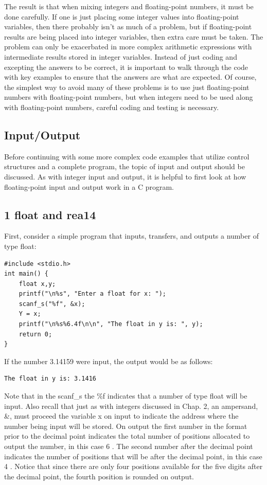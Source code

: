 \documentclass[10pt]{article}
\begin{document}
The result is that when mixing integers and floating-point numbers, it must be done carefully. If one is just placing some integer values into floating-point variables, then there probably isn't as much of a problem, but if floating-point results are being placed into integer variables, then extra care must be taken. The problem can only be exacerbated in more complex arithmetic expressions with intermediate results stored in integer variables. Instead of just coding and excepting the answers to be correct, it is important to walk through the code with key examples to ensure that the answers are what are expected. Of course, the simplest way to avoid many of these problems is to use just floating-point numbers with floating-point numbers, but when integers need to be used along with floating-point numbers, careful coding and testing is necessary.

\subsection*{Input/Output}
Before continuing with some more complex code examples that utilize control structures and a complete program, the topic of input and output should be discussed. As with integer input and output, it is helpful to first look at how floating-point input and output work in a C program.

\subsection*{1 float and rea14}
First, consider a simple program that inputs, transfers, and outputs a number of type float:

\begin{verbatim}
#include <stdio.h>
int main() {
    float x,y;
    printf("\n%s", "Enter a float for x: ");
    scanf_s("%f", &x);
    Y = x;
    printf("\n%s%6.4f\n\n", "The float in y is: ", y);
    return 0;
}
\end{verbatim}

If the number 3.14159 were input, the output would be as follows:

\begin{verbatim}
The float in y is: 3.1416
\end{verbatim}

Note that in the scanf\_s the \%f indicates that a number of type float will be input. Also recall that just as with integers discussed in Chap. 2, an ampersand, \&, must proceed the variable x on input to indicate the address where the number being input will be stored. On output the first number in the format prior to the decimal point indicates the total number of positions allocated to output the number, in this case 6 . The second number after the decimal point indicates the number of positions that will be after the decimal point, in this case 4 . Notice that since there are only four positions available for the five digits after the decimal point, the fourth position is rounded on output.
\end{document}
